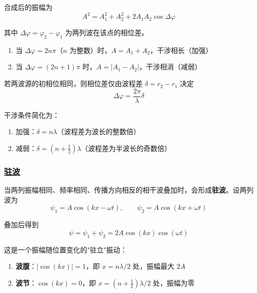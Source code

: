 合成后的振幅为
\begin{equation}
    A^2 = A_1^2 + A_2^2 + 2A_1 A_2\cos\Delta\varphi
\end{equation}

其中 $\Delta\varphi = \varphi_2 - \varphi_1$ 为两列波在该点的相位差。

\begin{enumerate}
    \item 当 $\Delta\varphi = 2n\pi$（$n$ 为整数）时，$A = A_1 + A_2$，干涉相长（加强）
    \item 当 $\Delta\varphi = (2n+1)\pi$ 时，$A = |A_1 - A_2|$，干涉相消（减弱）
\end{enumerate}

若两波源的初相位相同，则相位差仅由波程差 $\delta = r_2 - r_1$ 决定
\begin{equation}
    \Delta\varphi = \frac{2\pi}{\lambda}\delta
\end{equation}

干涉条件简化为：
\begin{enumerate}
    \item 加强：$\delta = n\lambda$（波程差为波长的整数倍）
    \item 减弱：$\delta = (n + \frac{1}{2})\lambda$（波程差为半波长的奇数倍）
\end{enumerate}

\subsubsection{\protect\hyperlink{:}{驻波}}

当两列振幅相同、频率相同、传播方向相反的相干波叠加时，会形成\textbf{驻波}。设两列波为
\begin{equation}
    \psi_1 = A\cos(kx - \omega t), \qquad \psi_2 = A\cos(kx + \omega t)
\end{equation}

叠加后得到
\begin{equation}
    \psi = \psi_1 + \psi_2 = 2A\cos(kx)\cos(\omega t)
\end{equation}

这是一个振幅随位置变化的"驻立"振动：
\begin{enumerate}
    \item \textbf{波腹}：$|\cos(kx)| = 1$，即 $x = n\lambda/2$ 处，振幅最大 $2A$
    \item \textbf{波节}：$\cos(kx) = 0$，即 $x = (n + \frac{1}{2})\lambda/2$ 处，振幅为零
\end{enumerate}

